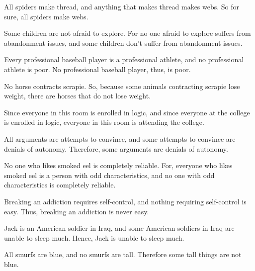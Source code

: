 \begin{exercises} 
\item  All spiders make thread, and anything that makes thread makes webs.  So for sure, all spiders make webs.

\item  Some children are not afraid to explore. For no one afraid to explore suffers from abandonment issues, and some children don't suffer from abandonment issues.


%

 
\item  Every professional baseball player is a professional athlete, and no professional athlete is poor. No professional baseball player, thus, is poor.


\item  No horse contracts scrapie. So, because some animals contracting scrapie lose weight, there are horses that do not lose weight.

%



\item  Since everyone in this room is enrolled in logic, and since everyone at the college is enrolled in logic, everyone in this room is attending the college.

\item   All arguments are attempts to convince, and some attempts to convince are denials of autonomy. Therefore, some arguments are denials of autonomy.

\item  No one who likes smoked eel is completely reliable. For, everyone who likes smoked eel is a person with odd characteristics, and no one with odd characteristics is completely reliable.

\item Breaking an addiction requires self-control, and nothing requiring self-control is easy. Thus, breaking an addiction is never easy.
 
\item Jack is an American soldier in Iraq, and some American soldiers in Iraq are unable to sleep much. Hence, Jack is unable to sleep much.

\item All smurfs are blue, and no smurfs are tall. Therefore some tall things are not blue.



\end{exercises}

